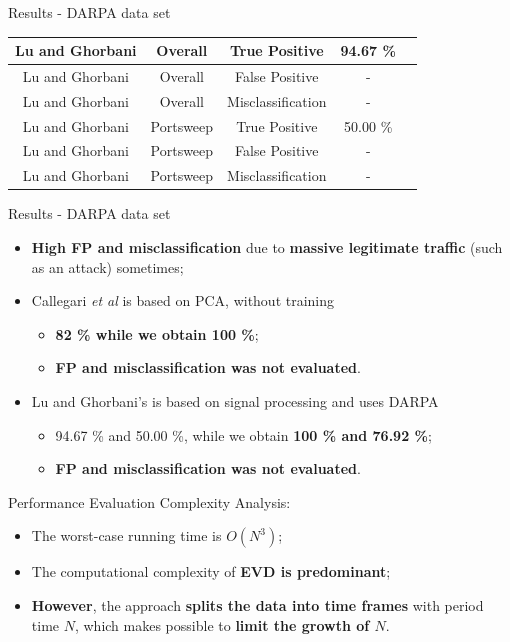 \documentclass[newPxFont, numfooter, sectionpages]{beamer}
\begin{document}
\begin{frame}{Results - DARPA data set}
\begin{table}[!t]
\begin{tabular}{|c|c|c|c|c|}
			Lu and Ghorbani	&Overall	&True Positive	&94.67 \%\\ \hline
			Lu and Ghorbani	&Overall	&False Positive	&-\\ \hline
			Lu and Ghorbani	&Overall	&Misclassification	&-\\ \hline
			Lu and Ghorbani	&Portsweep	&True Positive	&50.00 \%\\ \hline
			Lu and Ghorbani	&Portsweep	&False Positive	&-\\ \hline
			Lu and Ghorbani	&Portsweep	&Misclassification	&-\\ \hline
		\end{tabular}
	\end{table}
\end{frame}

\begin{frame}{Results - DARPA data set}
	\begin{itemize}
		\item \textbf{High FP and misclassification} due to \textbf{massive legitimate traffic} (such as an attack) sometimes;
		\item Callegari \emph{et al} is based on PCA, without training
		\begin{itemize}
			\item \textbf{82 \% while we obtain 100 \%};
			\item \textbf{FP and misclassification was not evaluated}.
		\end{itemize}
		\item Lu and Ghorbani's is based on signal processing and uses DARPA
		\begin{itemize}
			\item 94.67 \% and 50.00 \%, while we obtain \textbf{100 \% and 76.92 \%};
			\item \textbf{FP and misclassification was not evaluated}.
		\end{itemize}
	\end{itemize}
\end{frame}

\begin{frame}{Performance Evaluation}
	Complexity Analysis:
	\begin{itemize}
		\item The worst-case running time is $O(N^3)$;
		\item The computational complexity of \textbf{EVD is predominant};
		\item \textbf{However}, the approach \textbf{splits the data into time frames} with period time $N$, which makes possible to \textbf{limit the growth of $N$}.
	\end{itemize}
\end{frame}
\end{document}
